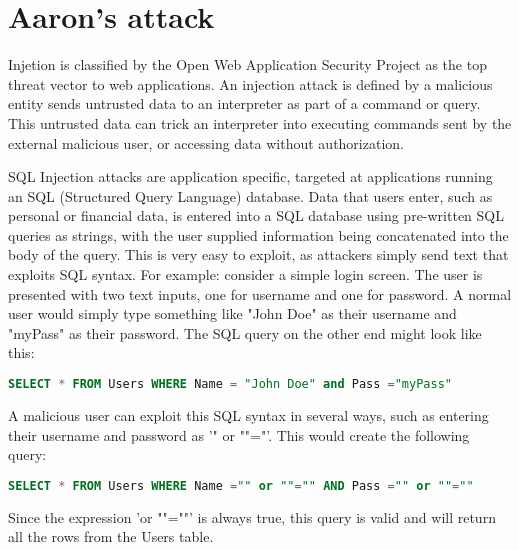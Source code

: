 \section{Aaron's attack}

Injetion is classified by the Open Web Application Security Project as the top threat vector to web applications. An injection attack is defined by a malicious entity sends untrusted data to an interpreter as part of a command or query. This untrusted data can trick an interpreter into executing commands sent by the external malicious user, or accessing data without authorization.

SQL Injection attacks are application specific, targeted at applications running an SQL (Structured Query Language) database. Data that users enter, such as personal or financial data, is entered into a SQL database using pre-written SQL queries as strings, with the user supplied information being concatenated into the body of the query. This is very easy to exploit, as attackers simply send text that exploits SQL syntax. For example: consider a simple login screen. The user is presented with two text inputs, one for username and one for password. A normal user would simply type something like "John Doe" as their username and "myPass" as their password. The SQL query on the other end might look like this: 

\begin{lstlisting}[language = SQL]
SELECT * FROM Users WHERE Name = "John Doe" and Pass ="myPass"
\end{lstlisting} 

A malicious user can exploit this SQL syntax in several ways, such as entering their username and password as '" or ""="'. This would create the following query: 

\begin{lstlisting}[language = SQL]
SELECT * FROM Users WHERE Name ="" or ""="" AND Pass ="" or ""=""
\end{lstlisting} 

Since the expression 'or ""=""' is always true, this query is valid and will return all the rows from the Users table.